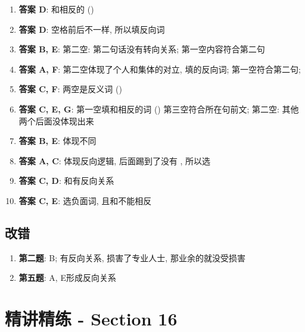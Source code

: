   \begin{enumerate}
    \item \textbf{答案 D}: 和相反的 ()
    \item \textbf{答案 D}: 空格前后不一样, 所以填反向词
    \item \textbf{答案 B, E}: 第二空: 第二句话没有转向关系; 第一空内容符合第二句
    \item \textbf{答案 A, F}: 第二空体现了个人和集体的对立, 填的反向词;
    第一空符合第二句;
    \item \textbf{答案 C, F}: 两空是反义词 ()
    \item \textbf{答案 C, E, G}: 第一空填和相反的词 ()
    第三空符合所在句前文; 第二空: 其他两个后面没体现出来
    \item \textbf{答案 B, E}: 体现不同
    \item \textbf{答案 A, C}: 体现反向逻辑, 后面踢到了没有
    , 所以选
    \item \textbf{答案 C, D}: 和有反向关系
    \item \textbf{答案 C, E}: 选负面词, 且和不能相反
  \end{enumerate}

  \subsection{改错}

    \begin{enumerate}
      \item \textbf{第二题}: B; 有反向关系,
      损害了专业人士, 那业余的就没受损害
      \item \textbf{第五题}: A, E形成反向关系
    \end{enumerate}

\section{精讲精练 - Section 16}


